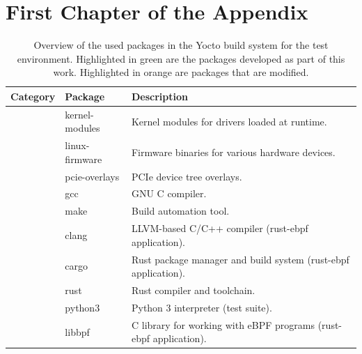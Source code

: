 \chapter{First Chapter of the Appendix}
\begin{table}
\caption[Overview of the used packages in the Yocto build system for the test environment.]{Overview of the used packages in the Yocto build system for the test environment. Highlighted in green are the packages developed as part of this work. Highlighted in orange are packages that are modified.}
\label{tab:used_packages}
\centering
\begin{tabular}{|p{3.5cm}|p{4cm}|p{8cm}|}
\hline
\textbf{Category} & \textbf{Package} & \textbf{Description} \\
\hline

& kernel-modules & Kernel modules for drivers loaded at runtime. \\ 
& linux-firmware & Firmware binaries for various hardware devices. \\ 
& pcie-overlays & PCIe device tree overlays. \\ \hline

& gcc & GNU C compiler. \\ 
& make & Build automation tool. \\ 
& clang & LLVM-based C/C++ compiler (rust-ebpf application). \\ 
& cargo & Rust package manager and build system (rust-ebpf application). \\ 
& rust & Rust compiler and toolchain. \\ 
& python3 & Python 3 interpreter (test suite). \\ \hline
& libbpf & C library for working with eBPF programs (rust-ebpf application). \\ 


\end{tabular}
\end{table}
